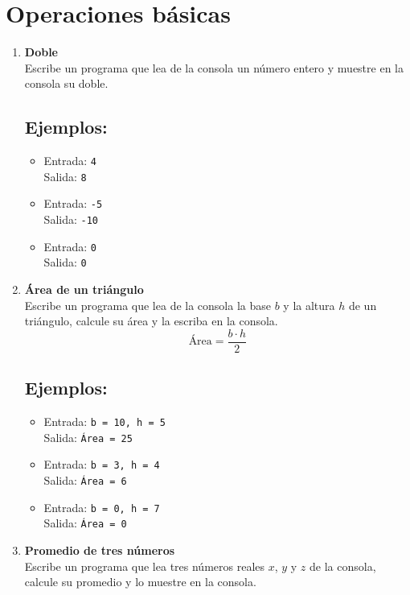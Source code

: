 \section{Operaciones básicas}
\begin{enumerate}
    \item \textbf{Doble}\\
    Escribe un programa que lea de la consola un número entero y muestre en la consola su doble.
    \subsection*{Ejemplos:}
    \begin{itemize}
        \item Entrada: \texttt{4}\\
              Salida: \texttt{8}
        \item Entrada: \texttt{-5}\\
              Salida: \texttt{-10}
        \item Entrada: \texttt{0}\\
              Salida: \texttt{0}
    \end{itemize}
    
    \item \textbf{Área de un triángulo}\\
    Escribe un programa que lea de la consola la base \(b\) y la altura \(h\) de un triángulo, calcule su área y la escriba en la consola.\\
    \[
    \text{Área} = \frac{b \cdot h}{2}
    \]
    \subsection*{Ejemplos:}
    \begin{itemize}
        \item Entrada: \texttt{b = 10, h = 5}\\
              Salida: \texttt{Área = 25}
        \item Entrada: \texttt{b = 3, h = 4}\\
              Salida: \texttt{Área = 6}
        \item Entrada: \texttt{b = 0, h = 7}\\
              Salida: \texttt{Área = 0}
    \end{itemize}

    \item \textbf{Promedio de tres números}\\
    Escribe un programa que lea tres números reales \(x\), \(y\) y \(z\) de la consola, calcule su promedio y lo muestre en la consola.

\end{enumerate}
